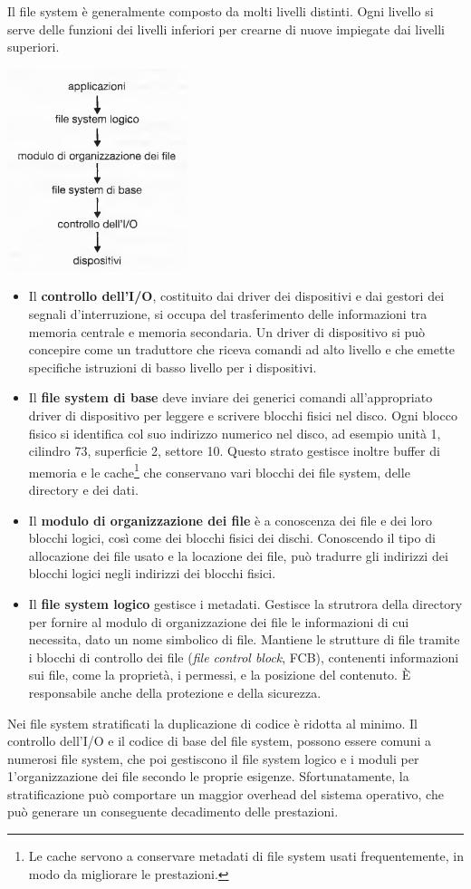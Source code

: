 \documentclass[11pt,a4paper]{article}
\begin{document}
{Il file system è generalmente composto da molti livelli distinti.
Ogni livello si serve delle funzioni dei livelli inferiori per crearne di nuove impiegate dai livelli superiori.
\begin{center}
  \includegraphics[scale=0.6]{img/0052.png}
\end{center}
\begin{itemize}
  \item Il \textbf{controllo dell'I/O}, costituito dai driver dei dispositivi e dai gestori dei segnali d'interruzione, si occupa del trasferimento delle informazioni tra memoria cen­trale e memoria secondaria. Un driver di dispositivo si può concepire come un traduttore che riceva comandi ad alto livello e che emette specifiche istruzioni di basso livello per i dispositivi.
  \item Il \textbf{file system di base} deve inviare dei generici comandi all'appropriato driver di dispositivo per leggere e scrivere blocchi fisici nel disco. Ogni blocco fisico si identifica col suo indirizzo numerico nel disco, ad esempio unità 1, cilindro 73, superficie 2, settore 10. Questo strato gestisce inoltre buffer di memoria e le cache\footnote{Le cache servono a conservare metadati di file system usati frequentemente, in modo da migliorare le prestazioni.} che conservano vari blocchi dei fi­le system, delle directory e dei dati.
  \item Il \textbf{modulo di organizzazione dei file} è a conoscenza dei file e dei loro blocchi logici, così come dei blocchi fisici dei dischi. Conoscendo il tipo di allocazione dei file usato e la locazione dei file, può tradurre gli indirizzi dei blocchi logici negli indirizzi dei blocchi fisici.
  \item Il \textbf{file system logico} gestisce i metadati. Gestisce la strutrora della directory per fornire al modulo di organizzazione dei file le informazioni di cui necessita, dato un nome simbolico di file. Mantiene le strutture di file tramite i blocchi di controllo dei file (\emph{file control block}, FCB), contenenti informazioni sui file, come la proprietà, i permessi, e la posizione del contenuto. È responsabile anche della protezione e della sicurezza.
\end{itemize}
Nei file system stratificati la duplicazione di codice è ridotta al minimo. Il controllo dell'I/O e il codice di base del file system, possono essere comuni a numerosi file system, che poi gestiscono il file system logico e i moduli per 1'organizzazione dei file secon­do le proprie esigenze. Sfortunatamente, la stratificazione può comportare un maggior overhead del sistema operativo, che può generare un conseguente decadimento delle prestazioni.

}
\end{document}

